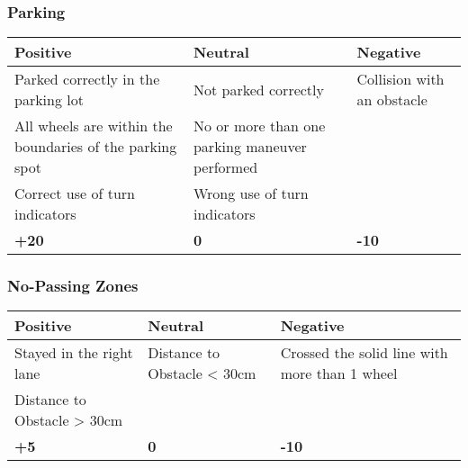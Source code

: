 {\begin{highlight}
		\subsubsection*{Parking}
		\begin{table}[H]
			\begin{tabularx}{\textwidth}{XXX}
				\toprule
				\textbf{Positive}                                        & \textbf{Neutral}                               & \textbf{Negative}          \\
				\midrule
				Parked correctly in the parking lot                      & Not parked correctly                           & Collision with an obstacle \\
				All wheels are within the boundaries of the parking spot & No or more than one parking maneuver performed &                            \\
				Correct use of turn indicators                           & Wrong use of turn indicators                   &                            \\
				\topstrut
				\textbf{+20}                                             & \textbf{0}                                     & \textbf{-10}               \\
				\bottomrule
			\end{tabularx}
		\end{table}

		\subsubsection*{No-Passing Zones}
		\begin{table}[H]
			\begin{tabularx}{\textwidth}{XXX}
				\toprule
				\textbf{Positive}           & \textbf{Neutral}            & \textbf{Negative}                             \\
				\midrule
				Stayed in the right lane    & Distance to Obstacle < 30cm & Crossed the solid line with more than 1 wheel \\
				Distance to Obstacle > 30cm &                             &                                               \\
				\topstrut
				\textbf{+5}                 & \textbf{0}                  & \textbf{-10}                                  \\
				\bottomrule
			\end{tabularx}
		\end{table}


\end{highlight}}
